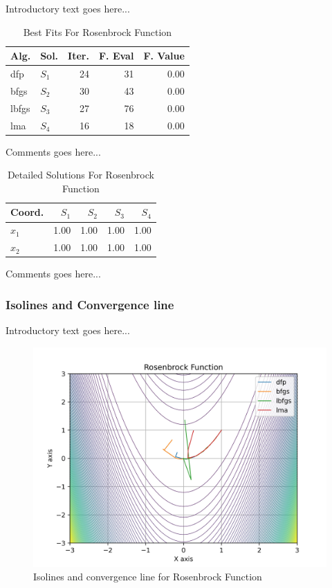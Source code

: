 \documentclass{ieeeaccess}
\begin{document}
Introductory text goes here...
\begin{table}
\centering
\caption{Best Fits For Rosenbrock Function}
\label{solutions:rosenbrock2d}
\begin{tabular}{llrrr}
\toprule
 Alg. &    Sol. &  Iter. &  F. Eval &  F. Value \\
\midrule
  dfp & $S_{1}$ &     24 &       31 &      0.00 \\
 bfgs & $S_{2}$ &     30 &       43 &      0.00 \\
lbfgs & $S_{3}$ &     27 &       76 &      0.00 \\
  lma & $S_{4}$ &     16 &       18 &      0.00 \\
\bottomrule
\end{tabular}
\end{table}


Comments goes here...
\begin{table}
\centering
\caption{Detailed Solutions For Rosenbrock Function}
\label{detailedsolutions:rosenbrock2d}
\begin{tabular}{lrrrr}
\toprule
 Coord. &  $S_{1}$ &  $S_{2}$ &  $S_{3}$ &  $S_{4}$ \\
\midrule
$x_{1}$ &     1.00 &     1.00 &     1.00 &     1.00 \\
$x_{2}$ &     1.00 &     1.00 &     1.00 &     1.00 \\
\bottomrule
\end{tabular}
\end{table}


Comments goes here...
\subsubsection{Isolines and Convergence line}
\label{isolinesrosenbrock2d2D}


Introductory text goes here...
\begin{figure}[h]
\centering
\includegraphics[scale=0.5]{images/rosenbrock2d.jpg}
\caption{Isolines and convergence line for Rosenbrock Function}
\label{fig:rosenbrock2d}
\end{figure}
\end{document}
